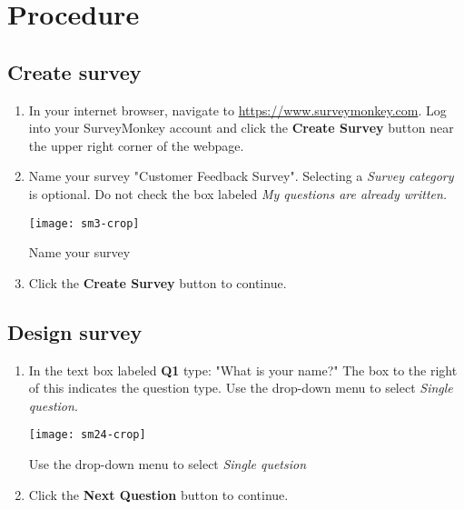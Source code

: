 \documentclass{tufte-handout}
\begin{document}
\section{Procedure}
\subsection{Create survey}

\begin{enumerate}
    \item In your internet browser, navigate to \url{https://www.surveymonkey.com}. Log into your SurveyMonkey account and click the \textbf{Create Survey} button near the upper right corner of the webpage.
    \item Name your survey "Customer Feedback Survey". Selecting a \textit{Survey category} is optional. Do not check the box labeled \textit{My questions are already written.}
    
      \begin{marginfigure}%
        \texttt{[image: sm3-crop]}
        \caption{Name your survey}
        \label{fig:marginfig1}
    \end{marginfigure}

    \item Click the \textbf{Create Survey} button to continue.

\end{enumerate}


\subsection{Design survey}


\begin{enumerate}
    \item In the text box labeled \textbf{Q1} type: "What is your name?" The box to the right of this indicates the question type. Use the drop-down menu to select \textit{Single question}. 

      \begin{marginfigure}[-2\baselineskip]
        \texttt{[image: sm24-crop]}
        \caption{Use the drop-down menu to select \textit{Single quetsion}}
        \label{fig:marginfig2}
    \end{marginfigure}

    \item Click the \textbf{Next Question} button to continue.
\end{enumerate}
\end{document}
